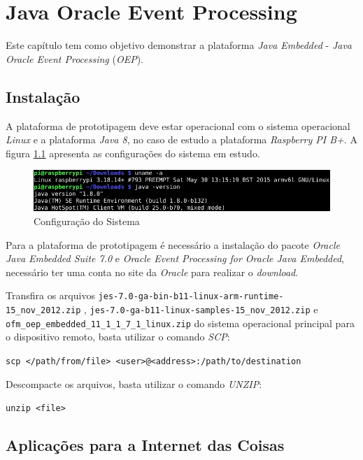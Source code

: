 %

\chapter{Java Oracle Event Processing}

Este capítulo tem como objetivo demonstrar a plataforma \textit{Java Embedded}
- \textit{Java Oracle Event Processing} (\textit{OEP}).

\section{Instalação}

A plataforma de prototipagem deve estar operacional com o sistema operacional
\textit{Linux} e a plataforma \textit{Java 8}, no caso de estudo a plataforma
\textit{Raspberry PI B+}. A figura \ref{fig:oep/configuracao} apresenta as
configurações do sistema em estudo.

\begin{figure}[H]
    \centering
    \includegraphics[width=0.7\linewidth]{figuras/java/configuracao}
    \caption{Configuração do Sistema}
    \label{fig:oep/configuracao}
\end{figure}

Para a plataforma de prototipagem é necessário a instalação do pacote
\textit{Oracle Java Embedded Suite 7.0} e \textit{Oracle Event Processing for
    Oracle Java Embedded}, necessário ter uma conta no site da \textit{Oracle}
para realizar o \textit{download}.

Transfira os arquivos \newline
\verb|jes-7.0-ga-bin-b11-linux-arm-runtime-15_nov_2012.zip|
, \newline
\verb|jes-7.0-ga-b11-linux-samples-15_nov_2012.zip|
e \newline
\verb|ofm_oep_embedded_11_1_1_7_1_linux.zip|
 do sistema operacional principal para o dispositivo remoto, basta utilizar o
comando \textit{SCP}:

\verb|scp </path/from/file> <user>@<address>:/path/to/destination|

Descompacte os arquivos, basta utilizar o comando \textit{UNZIP}:

\verb|unzip <file>|

\section{Aplicações para a Internet das Coisas}

